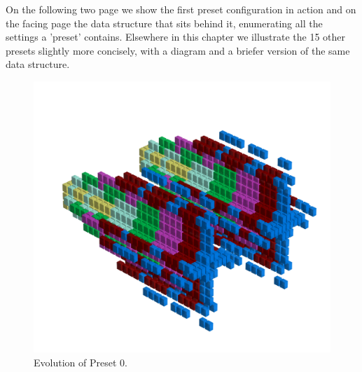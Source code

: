 On the following two page we show the first preset configuration in action and on the facing page the 
data structure that sits behind it, enumerating all the settings a 'preset' contains. Elsewhere in this
chapter we illustrate the 15 other presets slightly more concisely, with a diagram and a briefer version
of the same data structure.

\clearpage                                                                 
\begin{figure}[H]                                                          
  \centering                                                             
  \begin{adjustbox}{width=18cm,center}                                   
  \includegraphics[width=14cm]{src/presets/pattern0-45.png}%
  \end{adjustbox}                                                        
\caption{Evolution of Preset 0.}                                           
\end{figure}                                                               
\clearpage                                                                 
                                                                           
